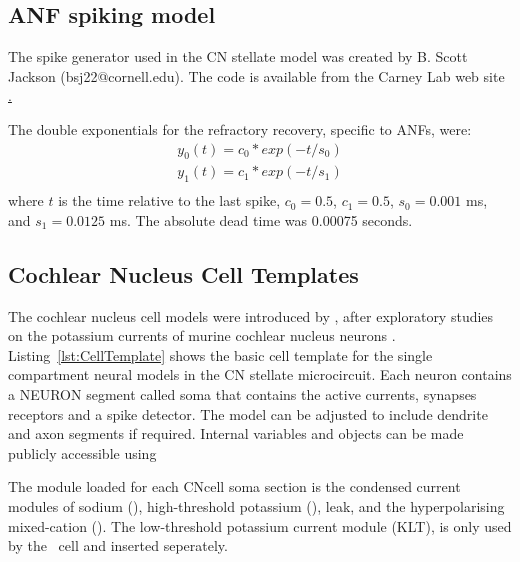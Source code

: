 \subsection[Spiking model]{ANF spiking model}

The spike generator used in the CN stellate model was created by
B. Scott Jackson (bsj22@cornell.edu).  The code is available from the
Carney Lab web site
\href{http://www.urmc.rochester.edu/smd/Nanat/faculty-research/lab-pages/LaurelCarney/auditory-models.cfm}.

The double exponentials for the refractory recovery, specific to ANFs,
were:
\begin{eqnarray}
y_0(t) = c_0*exp(-t/s_0) \\
y_1(t) = c_1*exp(-t/s_1) \\
\end{eqnarray}
where $t$ is the time relative to the last spike, $c_0 = 0.5$, $c_1 =
0.5$, $s_0 = 0.001$ ms, and $s_1 = 0.0125$ ms.  The absolute dead time
was 0.00075 seconds.





\subsection[CN cells]{Cochlear Nucleus Cell Templates }


The cochlear nucleus cell models were introduced by \citet{RothmanManis:2003b}, after exploratory studies on the potassium currents of murine cochlear nucleus neurons \citep{RothmanManis:2003,RothmanManis:2003a}.
Listing~\ref{lst:CellTemplate} shows the basic cell template for the single compartment neural models in the CN stellate microcircuit.
Each neuron contains a NEURON segment called soma that contains the active currents, synapses receptors and a spike detector. The model can be adjusted to include dendrite and axon segments if required.
Internal variables and objects can be made publicly accessible using

The  module loaded for each \textsf{CNcell} soma section is the condensed current modules of sodium (), high-threshold potassium (), leak, and the hyperpolarising mixed-cation ().
The low-threshold potassium current module (KLT), is only used by the \DS~cell and inserted seperately.

